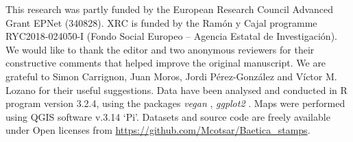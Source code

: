 \begin{acknowledgements}

This research was partly funded by the European Research Council Advanced Grant EPNet (340828). XRC is funded by the Ram\'on y Cajal programme RYC2018-024050-I (Fondo Social Europeo – Agencia Estatal de Investigaci\'on). We would like to thank the editor and two anonymous reviewers for their constructive comments that helped improve the original manuscript. We are grateful to Simon Carrignon, Juan Moros, Jordi P\'erez-Gonz\'alez and V\'ictor M. Lozano for their useful suggestions.  
Data have been analysed and conducted in R program version 3.2.4, using the packages \textit{vegan} \citep{oksanen_vegan_2007}, \textit{ggplot2} \citep{ggplot2:_2016}. Maps were performed using QGIS software v.3.14 `Pi'. Datasets and source code are freely available under Open licenses from \url{https://github.com/Mcotsar/Baetica\_stamps}.

\end{acknowledgements}





%



